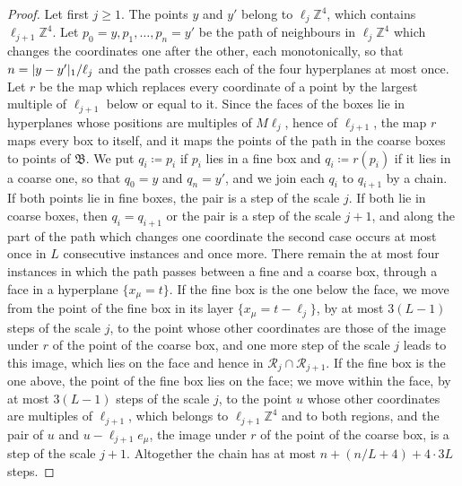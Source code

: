 \documentclass[11pt]{preprint}
\DeclarePairedDelimiter{\abs}{\lvert}{\rvert}
\numberwithin{equation}{section}
\theoremstyle{definition}
\theoremstyle{remark}
\theoremstyle{plain}
\begin{document}
\begin{proof}
Let first $j \geq 1$. The points $y$ and $y'$ belong to $\ell_j\mathbb Z^4$, which contains $\ell_{j+1}\mathbb Z^4$. Let $p_0 = y, p_1, \dots, p_n = y'$ be the path of neighbours in $\ell_j\mathbb Z^4$ which changes the coordinates one after the other, each monotonically, so that $n = \abs{y - y'}_1/\ell_j$ and the path crosses each of the four hyperplanes at most once. Let $r$ be the map which replaces every coordinate of a point by the largest multiple of $\ell_{j+1}$ below or equal to it. Since the faces of the boxes lie in hyperplanes whose positions are multiples of $M\ell_j$, hence of $\ell_{j+1}$, the map $r$ maps every box to itself, and it maps the points of the path in the coarse boxes to points of $\mathfrak B$. We put $q_i \coloneqq p_i$ if $p_i$ lies in a fine box and $q_i \coloneqq r(p_i)$ if it lies in a coarse one, so that $q_0 = y$ and $q_n = y'$, and we join each $q_i$ to $q_{i+1}$ by a chain. If both points lie in fine boxes, the pair is a step of the scale $j$. If both lie in coarse boxes, then $q_i = q_{i+1}$ or the pair is a step of the scale $j + 1$, and along the part of the path which changes one coordinate the second case occurs at most once in $L$ consecutive instances and once more. There remain the at most four instances in which the path passes between a fine and a coarse box, through a face in a hyperplane $\{ x_\mu = t \}$. If the fine box is the one below the face, we move from the point of the fine box in its layer $\{ x_\mu = t - \ell_j \}$, by at most $3(L - 1)$ steps of the scale $j$, to the point whose other coordinates are those of the image under $r$ of the point of the coarse box, and one more step of the scale $j$ leads to this image, which lies on the face and hence in $\mathcal R_j \cap \mathcal R_{j+1}$. If the fine box is the one above, the point of the fine box lies on the face; we move within the face, by at most $3(L - 1)$ steps of the scale $j$, to the point $u$ whose other coordinates are multiples of $\ell_{j+1}$, which belongs to $\ell_{j+1}\mathbb Z^4$ and to both regions, and the pair of $u$ and $u - \ell_{j+1}e_\mu$, the image under $r$ of the point of the coarse box, is a step of the scale $j + 1$. Altogether the chain has at most $n + (n/L + 4) + 4 \cdot 3L$ steps.


\end{proof}
\end{document}
